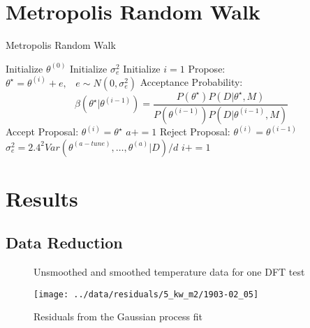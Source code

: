 \documentclass[article]{proc}
\begin{document}
\section{Metropolis Random Walk}

\begin{algorithm}
\caption{Metropolis Random Walk}\label{euclid}
\begin{algorithmic}[1]
\State Initialize $\theta^{(0)}$
\State Initialize $\sigma_e^2$
\State Initialize $i = 1$
    \State Propose: $\theta^{\star} = \theta^{(i)} + e, \hspace{10pt} e \sim N(0, \sigma_e^2)$
    \State Acceptance Probability: $$\beta (\theta^{\star} | \theta^{(i-1)}) = \frac{P(\theta^{\star})P(D|\theta^{\star},M)}{P(\theta^{(i-1)})P(D|\theta^{(i-1)}, M)}$$
            \State Accept Proposal: $\theta^{(i)} = \theta^{\star}$
            \State $a+=1$
        \Else
            \State Reject Proposal: $\theta^{(i)} = \theta^{(i-1)}$
        \EndIf
        \State $\sigma_e^2 = 2.4^2 Var(\theta^{(a-tune)}, \dots, \theta^{(a)}|D)/d$
    \EndWhile
    \State $i+=1$
\EndWhile
\end{algorithmic}
\end{algorithm}

\section{Results}

\subsection{Data Reduction}

\begin{figure}[b!]
    \centering
    \qquad
    \caption{Unsmoothed and smoothed temperature data for one DFT test}
    \label{fig:tc_data}
\end{figure}

\begin{figure}
    \centering
    \texttt{[image: ../data/residuals/5\_kw\_m2/1903-02\_05]}
    \caption{Residuals from the Gaussian process fit}
    \label{fig:gp_residuals}
\end{figure}
\end{document}
